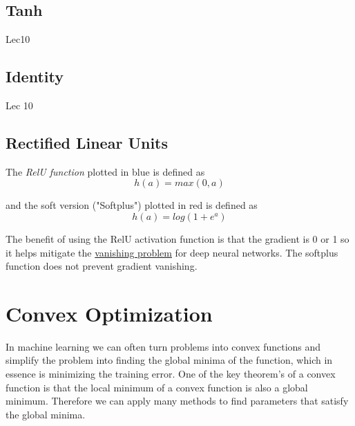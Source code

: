 \documentclass[12pt]{article}
\begin{document}
    \subsection{Tanh} \label{sec:Tanh} Lec10
    \subsection{Identity} Lec 10

    \subsection{Rectified Linear Units} \label{sec:RelU}
        The \textit{RelU function} plotted in blue is defined as
        $$ h(a) = max(0, a) $$

        and the soft version ("Softplus") plotted in red is defined as
        $$ h(a) = log(1 + e^a) $$

        
        The benefit of using the RelU activation function is that the gradient is 0 or 1 so it helps mitigate the
        \hyperref[sec:VanishingProblem]{vanishing problem} for deep neural networks. The softplus function does not
        prevent gradient vanishing.

\section{Convex Optimization} \label{sec:ConvexOptimization}
    In machine learning we can often turn problems into convex functions and simplify the problem into finding the
    global minima of the function, which in essence is minimizing the training error. One of the key theorem's of a
    convex function is that the local minimum of a convex function is also a global minimum. Therefore we can apply many
    methods to find parameters that satisfy the global minima.
\end{document}
